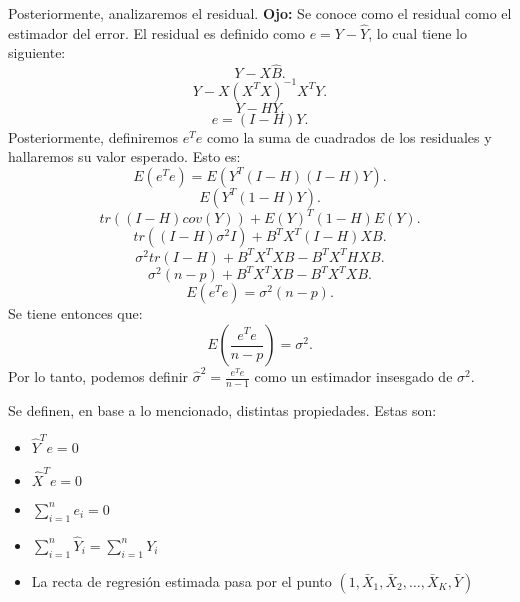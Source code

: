 \documentclass{article}
\begin{document}
Posteriormente, analizaremos el residual. \textbf{Ojo: }Se conoce como el residual como el estimador del error. El residual es definido como $e=Y-\hat{Y}$, lo cual tiene lo siguiente:
\[ 
Y-X\hat{B}
.\]
\[ 
	Y-X(X^{T}X)^{-1}X^{T}Y
.\]
\[ 
Y-HY
.\]
\[ 
	e=(I-H)Y
.\]
Posteriormente, definiremos $e^{T}e$ como la suma de cuadrados de los residuales y hallaremos su valor esperado. Esto es:
\[ 
	E(e^{T}e)=E(Y^{T}(I-H)(I-H)Y)
.\]
\[ 
	E(Y^{T}(1-H)Y)
.\]
\[ 
	tr((I-H)cov(Y)) + E(Y)^{T}(1-H)E(Y)
.\]
\[ 
	tr((I-H)\sigma^{2}I)+B^{T}X^{T}(I-H)XB
.\]
\[ 
	\sigma^{2}tr(I-H)+B^{T}X^{T}XB-B^{T}X^{T}HXB
.\]
\[ 
	\sigma^{2}(n-p)+B^{T}X^{T}XB-B^{T}X^{T}XB
.\]
\[ 
	E(e^{T}e)=\sigma^{2}(n-p)
.\]
Se tiene entonces que:
\[ 
	E(\frac{e^{T}e}{n-p})=\sigma^{2}
.\]
Por lo tanto, podemos definir $\hat{\sigma}^{2}=\frac{e^{T}e}{n-1}$ como un estimador insesgado de $\sigma^{2}$.

Se definen, en base a lo mencionado, distintas propiedades. Estas son:
\begin{itemize}
	\item $\hat{Y}^{T}e=0$
	\item $\hat{X}^{T}e=0$
	\item $\sum_{i=1}^{n}e_{i}=0$
	\item $\sum_{i=1}^{n}\hat{Y}_{i}=\sum_{i=1}^{n}Y_{i}$
	\item La recta de regresión estimada pasa por el punto $(1,\bar{X}_{1},\bar{X}_{2},\ldots,\bar{X}_{K},\bar{Y})$
\end{itemize}
\end{document}
